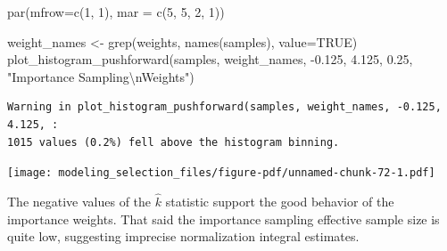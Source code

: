\documentclass[
  letterpaper,
  DIV=11,
  numbers=noendperiod]{scrartcl}
\newenvironment{Shaded}{\begin{snugshade}}{\end{snugshade}}
\newcommand{\AttributeTok}[1]{\textcolor[rgb]{0.40,0.45,0.13}{#1}}
\newcommand{\ConstantTok}[1]{\textcolor[rgb]{0.56,0.35,0.01}{#1}}
\newcommand{\DecValTok}[1]{\textcolor[rgb]{0.68,0.00,0.00}{#1}}
\newcommand{\FloatTok}[1]{\textcolor[rgb]{0.68,0.00,0.00}{#1}}
\newcommand{\FunctionTok}[1]{\textcolor[rgb]{0.28,0.35,0.67}{#1}}
\newcommand{\NormalTok}[1]{\textcolor[rgb]{0.00,0.23,0.31}{#1}}
\newcommand{\OtherTok}[1]{\textcolor[rgb]{0.00,0.23,0.31}{#1}}
\newcommand{\SpecialCharTok}[1]{\textcolor[rgb]{0.37,0.37,0.37}{#1}}
\newcommand{\StringTok}[1]{\textcolor[rgb]{0.13,0.47,0.30}{#1}}
\begin{document}
\begin{Shaded}
\begin{Highlighting}[]
\FunctionTok{par}\NormalTok{(}\AttributeTok{mfrow=}\FunctionTok{c}\NormalTok{(}\DecValTok{1}\NormalTok{, }\DecValTok{1}\NormalTok{), }\AttributeTok{mar =} \FunctionTok{c}\NormalTok{(}\DecValTok{5}\NormalTok{, }\DecValTok{5}\NormalTok{, }\DecValTok{2}\NormalTok{, }\DecValTok{1}\NormalTok{))}

\NormalTok{weight\_names }\OtherTok{\textless{}{-}} \FunctionTok{grep}\NormalTok{(}\StringTok{\textquotesingle{}weights\textquotesingle{}}\NormalTok{, }\FunctionTok{names}\NormalTok{(samples), }\AttributeTok{value=}\ConstantTok{TRUE}\NormalTok{)}
\FunctionTok{plot\_histogram\_pushforward}\NormalTok{(samples, weight\_names, }\SpecialCharTok{{-}}\FloatTok{0.125}\NormalTok{, }\FloatTok{4.125}\NormalTok{, }\FloatTok{0.25}\NormalTok{,}
                           \StringTok{"Importance Sampling}\SpecialCharTok{\textbackslash{}n}\StringTok{Weights"}\NormalTok{)}
\end{Highlighting}
\end{Shaded}

\begin{verbatim}
Warning in plot_histogram_pushforward(samples, weight_names, -0.125, 4.125, :
1015 values (0.2%) fell above the histogram binning.
\end{verbatim}

\texttt{[image: modeling\_selection\_files/figure-pdf/unnamed-chunk-72-1.pdf]}

The negative values of the \(\hat{k}\) statistic support the good
behavior of the importance weights. That said the importance sampling
effective sample size is quite low, suggesting imprecise normalization
integral estimates.
\end{document}

